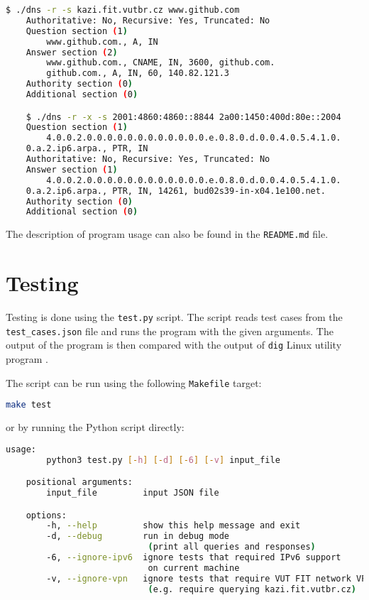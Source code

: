 \documentclass[a4paper, 11pt]{article}
\begin{document}
\begin{lstlisting}[language=bash]
    $ ./dns -r -s kazi.fit.vutbr.cz www.github.com
    Authoritative: No, Recursive: Yes, Truncated: No
    Question section (1)
        www.github.com., A, IN
    Answer section (2)
        www.github.com., CNAME, IN, 3600, github.com.
        github.com., A, IN, 60, 140.82.121.3
    Authority section (0)
    Additional section (0)

    $ ./dns -r -x -s 2001:4860:4860::8844 2a00:1450:400d:80e::2004
    Question section (1)
        4.0.0.2.0.0.0.0.0.0.0.0.0.0.0.0.e.0.8.0.d.0.0.4.0.5.4.1.0.
    0.a.2.ip6.arpa., PTR, IN
    Authoritative: No, Recursive: Yes, Truncated: No
    Answer section (1)
        4.0.0.2.0.0.0.0.0.0.0.0.0.0.0.0.e.0.8.0.d.0.0.4.0.5.4.1.0.
    0.a.2.ip6.arpa., PTR, IN, 14261, bud02s39-in-x04.1e100.net.
    Authority section (0)
    Additional section (0)
    \end{lstlisting}

    The description of program usage can also be found in the \texttt{README.md} file.
\section{Testing}
    Testing is done using the \texttt{test.py} script.
    The script reads test cases from the \texttt{test\_cases.json} file and runs the program with the given arguments.
    The output of the program is then compared with the output of \texttt{dig} Linux utility program \cite{2023}.

    The script can be run using the following \texttt{Makefile} target:
    \begin{lstlisting}[language=bash]
    make test
    \end{lstlisting}
    or by running the Python script directly:
    \begin{lstlisting}[language=bash]
    usage:
        python3 test.py [-h] [-d] [-6] [-v] input_file

    positional arguments:
        input_file         input JSON file

    options:
        -h, --help         show this help message and exit
        -d, --debug        run in debug mode 
                            (print all queries and responses)
        -6, --ignore-ipv6  ignore tests that required IPv6 support 
                            on current machine
        -v, --ignore-vpn   ignore tests that require VUT FIT network VPN 
                            (e.g. require querying kazi.fit.vutbr.cz)
    \end{lstlisting}
\end{document}
